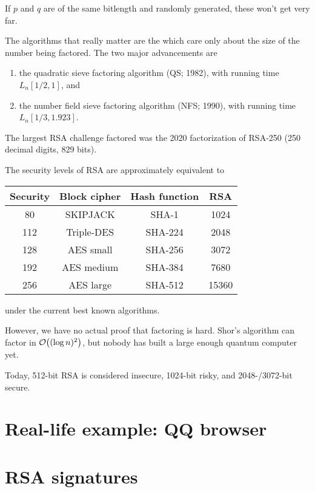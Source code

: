 \documentclass[class=co487,tikz,minted,notes]{agony}
\begin{document}
If $p$ and $q$ are of the same bitlength and randomly generated,
these won't get very far.

The algorithms that really matter are the 
which care only about the size of the number being factored.
The two major advancements are
\begin{enumerate}[nosep]
  \item the quadratic sieve factoring algorithm (QS; 1982), with running time $L_n[1/2,1]$, and
  \item the number field sieve factoring algorithm (NFS; 1990), with running time $L_n[1/3,1.923]$.
\end{enumerate}

The largest RSA challenge factored was the 2020 factorization of RSA-250
(250 decimal digits, 829 bits).

The security levels of RSA are approximately equivalent to
\begin{center}
  \begin{tabular}{c|ccc}
    Security & Block cipher & Hash function & RSA   \\ \hline
    80       & SKIPJACK     & SHA-1         & 1024  \\
    112      & Triple-DES   & SHA-224       & 2048  \\
    128      & AES small    & SHA-256       & 3072  \\
    192      & AES medium   & SHA-384       & 7680  \\
    256      & AES large    & SHA-512       & 15360
  \end{tabular}
\end{center}
under the current best known algorithms.

However, we have no actual proof that factoring is hard.
Shor's algorithm can factor in $\order{(\log n)^2}$,
but nobody has built a large enough quantum computer yet.

Today, 512-bit RSA is considered insecure, 1024-bit risky, and 2048-/3072-bit secure.

\section{Real-life example: QQ browser}

\section{RSA signatures}
\end{document}
